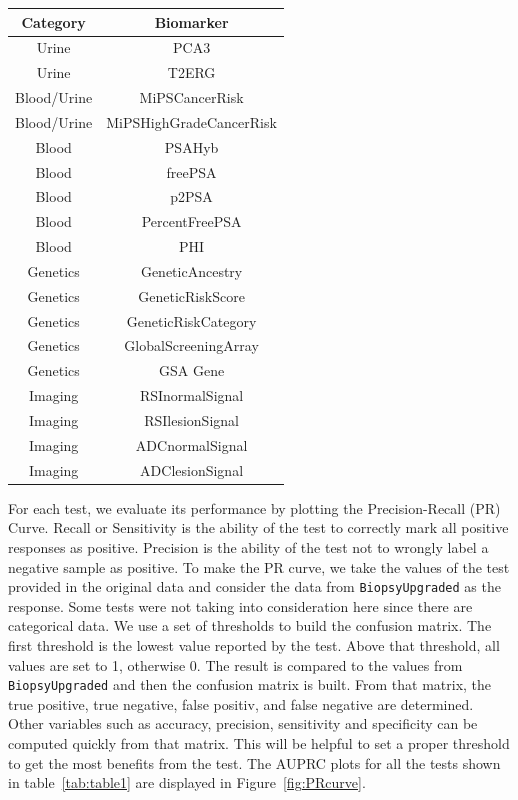 \documentclass[]{article}
\begin{document}
\begin{center}
\begin{tabular}{|c|c|}
\hline
{\bf Category} & {\bf Biomarker}  \\
\hline
Urine  & PCA3  \\
\hline
Urine  & T2ERG  \\
\hline 
Blood/Urine &  MiPSCancerRisk  \\
\hline
Blood/Urine &  MiPSHighGradeCancerRisk  \\
\hline
Blood & PSAHyb  \\
\hline 
Blood & freePSA  \\
\hline
Blood & p2PSA \\
\hline
Blood & PercentFreePSA  \\
\hline
Blood & PHI \\
\hline
Genetics & GeneticAncestry  \\
\hline
Genetics & GeneticRiskScore  \\
\hline
Genetics & GeneticRiskCategory  \\
\hline
Genetics & GlobalScreeningArray  \\
\hline
Genetics & GSA Gene  \\
\hline
Imaging  & RSInormalSignal   \\
\hline
Imaging  & RSIlesionSignal  \\
\hline
Imaging  & ADCnormalSignal  \\
\hline
Imaging  & ADClesionSignal  \\
\hline
\end{tabular}
\label{tab:table1}
\end{center}

\noindent For each test, we evaluate its performance by plotting the Precision-Recall (PR) Curve. Recall or Sensitivity 
is the ability of the test to correctly mark all positive responses as positive. Precision is 
the ability of the test not to wrongly label a negative sample as positive.  To make the PR curve, 
we take the values of the test provided in the original data and consider the data from \verb|BiopsyUpgraded| as the response. 
Some tests were not taking into consideration here since there are categorical data. We use a set of thresholds to build the 
confusion matrix. The first threshold is the lowest value reported by the test. Above that threshold, all values are set to 
1, otherwise 0. The result is compared to the values from \verb|BiopsyUpgraded| and then the
confusion matrix is built. From that matrix, the true positive, true negative, false positiv, and false negative are determined.
Other variables such as accuracy, precision, sensitivity and specificity can be computed quickly from that matrix. This will be 
helpful to set a proper threshold to get the most benefits from the test. The AUPRC plots for all the tests shown in 
table~\ref{tab:table1} are displayed in Figure~\ref{fig:PRcurve}. \\
\end{document}
